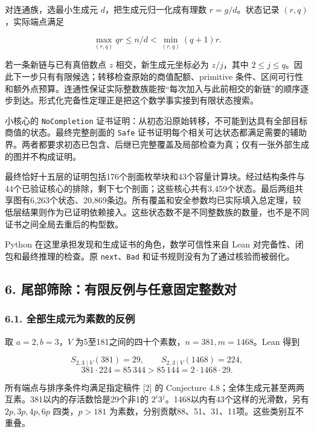 \documentclass[
  11pt,
]{article}
\begin{document}
对连通族，选最小生成元 \(d\)，把生成元归一化成有理数 \(r=g/d\)。状态记录
\((r,q)\)，实际端点满足

\[
\max_{(r,q)} qr\le n/d<\min_{(r,q)}(q+1)r. \tag{8}
\]

若一条新链与已有真倍数点 \(z\) 相交，新生成元坐标必为 \(z/j\)，其中
\(2\le j\le q\)。因此下一步只有有限候选；转移检查原始的商值配额、primitive
条件、区间可行性和额外点预算。连通性保证实际整数族能按``每次加入与此前相交的新链''的顺序逐步到达。形式化完备性定理正是把这个数学事实接到有限状态搜索。

小核心的 \texttt{NoCompletion}
证书证明：从初态沿原始转移，不可能到达具有全部目标商值的状态。最终完整剖面的
\texttt{Safe}
证书证明每个相关可达状态都满足需要的辅助界。两者都要求初态已包含、后继已完整覆盖及局部检查为真；仅有一张外部生成的图并不构成证明。

最终恰好十五层的证明包括176个剖面枚举块和43个容量计算块。经过结构条件与44个已验证核心的排除，剩下七个剖面；这些核心共有3,459个状态。最后两组共享图有6,263个状态、20,869条边。所有覆盖和安全参数均已实际填入总定理，较低层结果则作为已证明依赖接入。这些状态数不是不同整数族的数量，也不是不同证书之间全局去重后的构型数。

Python 在这里承担发现和生成证书的角色，数学可信性来自 Lean
对完备性、闭包和最终推理的检查。原 \texttt{next}、\texttt{Bad}
和证书规则没有为了通过核验而被弱化。

\hypertarget{ux5c3eux90e8ux7b5bux9664ux6709ux9650ux53cdux4f8bux4e0eux4efbux610fux56faux5b9aux6574ux6570ux5bf9}{%
\subsection{6.
尾部筛除：有限反例与任意固定整数对}\label{ux5c3eux90e8ux7b5bux9664ux6709ux9650ux53cdux4f8bux4e0eux4efbux610fux56faux5b9aux6574ux6570ux5bf9}}

\hypertarget{ux5168ux90e8ux751fux6210ux5143ux4e3aux7d20ux6570ux7684ux53cdux4f8b}{%
\subsubsection{6.1.
全部生成元为素数的反例}\label{ux5168ux90e8ux751fux6210ux5143ux4e3aux7d20ux6570ux7684ux53cdux4f8b}}

取 \(a=2,b=3\)，\(V\) 为5至181之间的四十个素数，\(n=381,m=1468\)。Lean
得到

\[
S_{2,3\mid V}(381)=29,\qquad S_{2,3\mid V}(1468)=224,
\] \[
381\cdot224=85\,344>85\,144=2\cdot1468\cdot29.
\]

所有端点与排序条件均满足指定稿件 {[}2{]} 的 Conjecture
4.8；全体生成元甚至两两互素。381以内的存活数恰是29个非1的
\(2^i3^j\)。1468以内有43个这样的光滑数，另有 \(2p,3p,4p,6p\)
四类，\(p>181\) 为素数，分别贡献88、51、31、11项。这些类别互不重叠。
\end{document}
